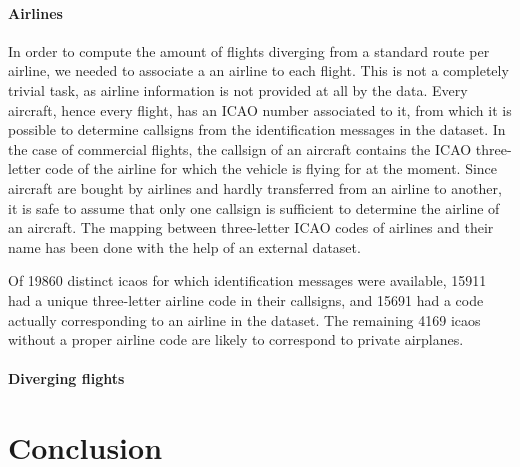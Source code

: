 \documentclass{vldb}
\begin{document}

\paragraph{Airlines}

In order to compute the amount of flights diverging from a standard route per
airline, we needed to associate a an airline to each flight. This is not a
completely trivial task, as airline information is not provided at all by the
data. Every aircraft, hence every flight, has an ICAO number associated to it,
from which it is possible to determine callsigns from the identification
messages in the dataset. In the case of commercial flights, the callsign of an
aircraft contains the ICAO three-letter code of the airline for which the
vehicle is flying for at the moment. Since aircraft are bought by airlines and
hardly transferred from an airline to another, it is safe to assume that only
one callsign is sufficient to determine the airline of an aircraft.
The mapping between three-letter ICAO codes of airlines and their name has been
done with the help of an external dataset.

Of 19860 distinct icaos for which identification messages were available, 15911
had a unique three-letter airline code in their callsigns, and 15691 had a code
actually corresponding to an airline in the dataset. The remaining 4169
icaos without a proper airline code are likely to correspond to private airplanes.

\paragraph{Diverging flights}


\section{Conclusion}
\end{document}

